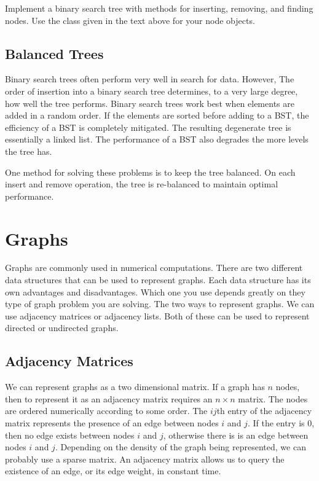 \begin{problem}
Implement a binary search tree with methods for inserting, removing, and finding nodes.
Use the  class given in the text above for your node objects.
\end{problem}

\subsection*{Balanced Trees}
Binary search trees often perform very well in search for data.
However, The order of insertion into a binary search tree determines, to a very large degree, how well the tree performs.
Binary search trees work best when elements are added in a random order.
If the elements are sorted before adding to a BST, the efficiency of a BST is completely mitigated.  
The resulting degenerate tree is essentially a linked list.
The performance of a BST also degrades the more levels the tree has. 

One method for solving these problems is to keep the tree balanced.
On each insert and remove operation, the tree is re-balanced to maintain optimal performance.


\section*{Graphs}
Graphs are commonly used in numerical computations.
There are two different data structures that can be used to represent graphs.
Each data structure has its own advantages and disadvantages.
Which one you use depends greatly on they type of graph problem you are solving.
The two ways to represent graphs.  We can use adjacency matrices or adjacency lists.
Both of these can be used to represent directed or undirected graphs.

\subsection*{Adjacency Matrices}
We can represent graphs as a two dimensional matrix.  If a graph has $n$ nodes, then
to represent it as an adjacency matrix requires an $n \times n$ matrix.
The nodes are ordered numerically according to some order.
The $ij$th entry of the adjacency matrix represents the presence of an edge between nodes $i$ and $j$.
If the entry is 0, then no edge exists between nodes $i$ and $j$, otherwise there is is an edge between nodes $i$ and $j$.
Depending on the density of the graph being represented, we can probably use a sparse matrix.
An adjacency matrix allows us to query the existence of an edge, or its edge weight, in constant time.

